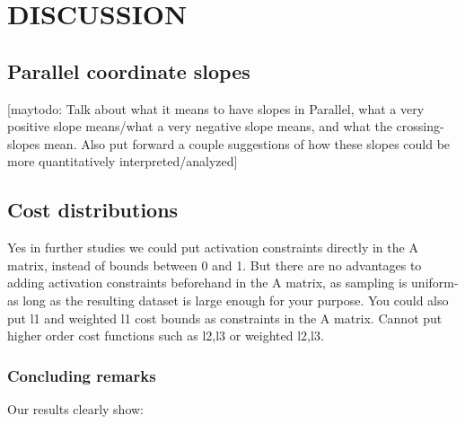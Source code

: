 \section{DISCUSSION}


\subsection{Parallel coordinate slopes} %
\label{sec:parallel_coordinate_slopes}
[maytodo: Talk about what it means to have slopes in Parallel, what a very positive slope means/what a very negative slope means, and what the crossing-slopes mean. Also put forward a couple suggestions of how these slopes could be more quantitatively interpreted/analyzed]

\subsection{Cost distributions} %
\label{sec:cost_distributions}
Yes in further studies we could put activation constraints directly in the A matrix, instead of bounds between 0 and 1. But there are no advantages to adding activation constraints beforehand in the A matrix, as sampling is uniform- as long as the resulting dataset is large enough for your purpose.
You could also put l1 and weighted l1 cost bounds as constraints in the A matrix. Cannot put higher order cost functions such as l2,l3 or weighted l2,l3.
\\

\subsubsection{Concluding remarks} %
\label{ssub:concluding_remarks}

Our results clearly show:\\

